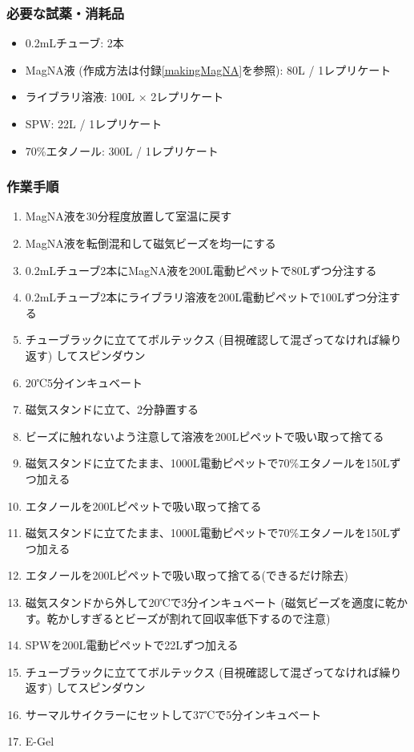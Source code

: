 \documentclass[titlepage,10pt,a4paper]{jsbook}
\begin{document}
\subsubsection{必要な試薬・消耗品}
\begin{itemize}
\item 0.2mLチューブ: 2本
\item MagNA液 (作成方法は付録\ref{makingMagNA}を参照): 80{\textmu}L / 1レプリケート
\item ライブラリ溶液: 100{\textmu}L × 2レプリケート
\item SPW: 22{\textmu}L / 1レプリケート
\item 70\%エタノール: 300{\textmu}L / 1レプリケート
\end{itemize}

\subsubsection{作業手順}
\begin{enumerate}
\item MagNA液を30分程度放置して室温に戻す
\item MagNA液を転倒混和して磁気ビーズを均一にする
\item 0.2mLチューブ2本にMagNA液を200{\textmu}L電動ピペットで80{\textmu}Lずつ分注する
\item 0.2mLチューブ2本にライブラリ溶液を200{\textmu}L電動ピペットで100{\textmu}Lずつ分注する
\item チューブラックに立ててボルテックス (目視確認して混ざってなければ繰り返す) してスピンダウン
\item 20℃5分インキュベート
\item 磁気スタンドに立て、2分静置する
\item ビーズに触れないよう注意して溶液を200{\textmu}Lピペットで吸い取って捨てる
\item 磁気スタンドに立てたまま、1000{\textmu}L電動ピペットで70\%エタノールを150{\textmu}Lずつ加える
\item エタノールを200{\textmu}Lピペットで吸い取って捨てる
\item 磁気スタンドに立てたまま、1000{\textmu}L電動ピペットで70\%エタノールを150{\textmu}Lずつ加える
\item エタノールを200{\textmu}Lピペットで吸い取って捨てる(できるだけ除去)
\item 磁気スタンドから外して20℃で3分インキュベート (磁気ビーズを適度に乾かす。乾かしすぎるとビーズが割れて回収率低下するので注意)
\item SPWを200{\textmu}L電動ピペットで22{\textmu}Lずつ加える
\item チューブラックに立ててボルテックス (目視確認して混ざってなければ繰り返す) してスピンダウン
\item サーマルサイクラーにセットして37℃で5分インキュベート
\item E-Gel
\end{enumerate}
\end{document}
